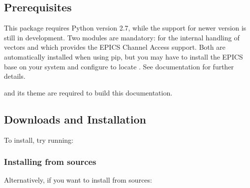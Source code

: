 \documentclass[letterpaper,10pt,english]{sphinxmanual}
\begin{document}
\subsection{Prerequisites}
\label{\detokenize{installation:prerequisites}}
This package requires Python version 2.7, while the support for newer version is
still in development. Two modules are mandatory:  for
the internal handling of vectors and  which provides the EPICS Channel
Access support. Both are automatically installed when using pip, but you may
have to install the EPICS base on your system and configure  to
locate . See  documentation for further details.

 and its theme  are required to build this
documentation.


\subsection{Downloads and Installation}
\label{\detokenize{installation:downloads-and-installation}}
To install, try running:

%
\begin{sphinxVerbatim}[commandchars=\\\{\}]
  
\end{sphinxVerbatim}


\subsubsection{Installing from sources}
\label{\detokenize{installation:installing-from-sources}}
Alternatively, if you want to install from sources:

%
\begin{sphinxVerbatim}[commandchars=\\\{\}]
  
\end{sphinxVerbatim}
\end{document}
